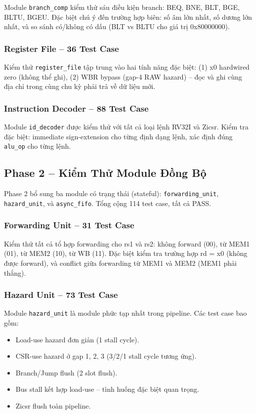 Module \texttt{branch\_comp} kiểm thử sáu điều kiện branch: BEQ, BNE, BLT, BGE, BLTU, BGEU. Đặc biệt chú ý đến trường hợp biên: số âm lớn nhất, số dương lớn nhất, và so sánh có/không có dấu (BLT vs BLTU cho giá trị 0x80000000).

\subsubsection{Register File -- 36 Test Case}

Kiểm thử \texttt{register\_file} tập trung vào hai tính năng đặc biệt: (1) x0 hardwired zero (không thể ghi), (2) WBR bypass (gap-4 RAW hazard) -- đọc và ghi cùng địa chỉ trong cùng chu kỳ phải trả về dữ liệu mới.

\subsubsection{Instruction Decoder -- 88 Test Case}

Module \texttt{id\_decoder} được kiểm thử với tất cả loại lệnh RV32I và Zicsr. Kiểm tra đặc biệt: immediate sign-extension cho từng định dạng lệnh, xác định đúng \texttt{alu\_op} cho từng lệnh.

\subsection{Phase 2 -- Kiểm Thử Module Đồng Bộ}

Phase 2 bổ sung ba module có trạng thái (stateful): \texttt{forwarding\_unit}, \texttt{hazard\_unit}, và \texttt{async\_fifo}. Tổng cộng 114 test case, tất cả PASS.

\subsubsection{Forwarding Unit -- 31 Test Case}

Kiểm thử tất cả tổ hợp forwarding cho rs1 và rs2: không forward (00), từ MEM1 (01), từ MEM2 (10), từ WB (11). Đặc biệt kiểm tra trường hợp rd = x0 (không được forward), và conflict giữa forwarding từ MEM1 và MEM2 (MEM1 phải thắng).

\subsubsection{Hazard Unit -- 73 Test Case}

Module \texttt{hazard\_unit} là module phức tạp nhất trong pipeline. Các test case bao gồm:
\begin{itemize}
    \item Load-use hazard đơn giản (1 stall cycle).
    \item CSR-use hazard ở gap 1, 2, 3 (3/2/1 stall cycle tương ứng).
    \item Branch/Jump flush (2 slot flush).
    \item Bus stall kết hợp load-use -- tình huống đặc biệt quan trọng.
    \item Zicsr flush toàn pipeline.
\end{itemize}

